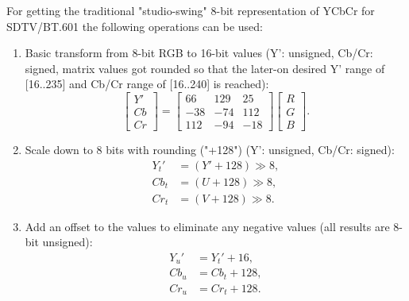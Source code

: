 \documentclass[a4paper,12pt,twoside]{article}
\begin{document}
For getting the traditional "studio-swing" 8-bit representation of YCbCr for SDTV/BT.601 the following operations can be used:
\begin{enumerate}
    \item Basic transform from 8-bit RGB to 16-bit values (Y': unsigned, Cb/Cr: signed, matrix values got rounded so that the later-on desired Y' range of [16..235] and Cb/Cr range of [16..240] is reached):
    \begin{equation}
        \begin{bmatrix}
        Y'\\
        Cb\\
        Cr
        \end{bmatrix}=
        \begin{bmatrix}
        66&129&25\\
        -38&-74&112
        \\112&-94&-18
        \end{bmatrix}
        \begin{bmatrix}
        R\\
        G\\
        B
        \end{bmatrix}.
    \end{equation}
    \item Scale down to 8 bits with rounding ("+128") (Y': unsigned, Cb/Cr: signed):
    \begin{equation}
        \begin{aligned}
            Y_{t}'&=(Y'+128)\gg 8,\\
            Cb_{t}&=(U+128)\gg 8,\\
            Cr_{t}&=(V+128)\gg 8.
        \end{aligned}
    \end{equation}
    \item Add an offset to the values to eliminate any negative values (all results are 8-bit unsigned):
    \begin{equation}
        \begin{aligned}
            Y_{u}'&=Y_{t}'+16,\\
            Cb_{u}&=Cb_{t}+128,\\
            Cr_{u}&=Cr_{t}+128.
        \end{aligned}
    \end{equation}

\end{enumerate}
\end{document}
